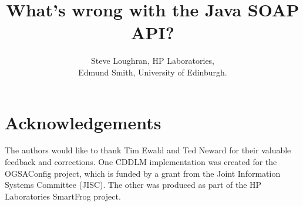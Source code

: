 \documentclass[a4]{article}
\begin{document}




\title{What's wrong with the Java SOAP API?}
\author{
    Steve Loughran, HP Laboratories,\\
    Edmund Smith, University of Edinburgh. 
    }
\maketitle









\section{Acknowledgements}

The authors would like to thank Tim Ewald and Ted Neward for their
valuable feedback and corrections. One CDDLM implementation was
created for the OGSAConfig project, which is funded by a grant from
the Joint Information Systems Committee (JISC). The other was produced
as part of the HP Laboratories SmartFrog project. 


\onecolumn

%


\end{document}
